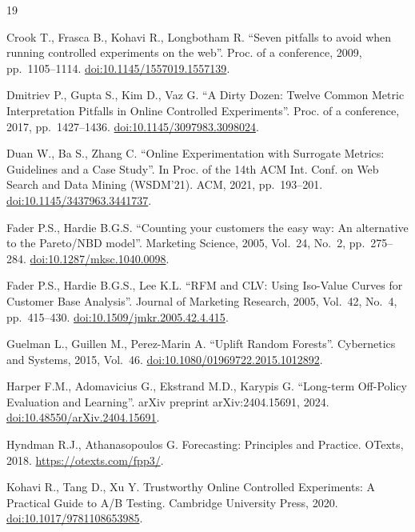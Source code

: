 \begin{thebibliography}{19}

Crook T., Frasca B., Kohavi R., Longbotham R.
``Seven pitfalls to avoid when running controlled experiments on the web''.
Proc. of a conference, 2009, pp.~1105--1114.
\href{https://doi.org/10.1145/1557019.1557139}{doi:10.1145/1557019.1557139}.

Dmitriev P., Gupta S., Kim D., Vaz G.
``A Dirty Dozen: Twelve Common Metric Interpretation Pitfalls in Online Controlled Experiments''.
Proc. of a conference, 2017, pp.~1427--1436.
\href{https://doi.org/10.1145/3097983.3098024}{doi:10.1145/3097983.3098024}.

Duan W., Ba S., Zhang C.
``Online Experimentation with Surrogate Metrics: Guidelines and a Case Study''.
In Proc. of the 14th ACM Int. Conf. on Web Search and Data Mining (WSDM'21).
ACM, 2021, pp.~193--201.
\href{https://doi.org/10.1145/3437963.3441737}{doi:10.1145/3437963.3441737}.

Fader P.S., Hardie B.G.S.
``Counting your customers the easy way: An alternative to the Pareto/NBD model''.
Marketing Science, 2005, Vol.~24, No.~2, pp.~275--284.
\href{https://doi.org/10.1287/mksc.1040.0098}{doi:10.1287/mksc.1040.0098}.

Fader P.S., Hardie B.G.S., Lee K.L.
``RFM and CLV: Using Iso-Value Curves for Customer Base Analysis''.
Journal of Marketing Research, 2005, Vol.~42, No.~4, pp.~415--430.
\href{https://doi.org/10.1509/jmkr.2005.42.4.415}{doi:10.1509/jmkr.2005.42.4.415}.

Guelman L., Guillen M., Perez-Marin A.
``Uplift Random Forests''.
Cybernetics and Systems, 2015, Vol.~46.
\href{https://doi.org/10.1080/01969722.2015.1012892}{doi:10.1080/01969722.2015.1012892}.

Harper F.M., Adomavicius G., Ekstrand M.D., Karypis G.
``Long-term Off-Policy Evaluation and Learning''.
arXiv preprint arXiv:2404.15691, 2024.
\href{https://doi.org/10.48550/arXiv.2404.15691}{doi:10.48550/arXiv.2404.15691}.

Hyndman R.J., Athanasopoulos G.
Forecasting: Principles and Practice.
OTexts, 2018.
\url{https://otexts.com/fpp3/}.

Kohavi R., Tang D., Xu Y.
Trustworthy Online Controlled Experiments: A Practical Guide to A/B Testing.
Cambridge University Press, 2020.
\href{https://doi.org/10.1017/9781108653985}{doi:10.1017/9781108653985}.


\end{thebibliography}
